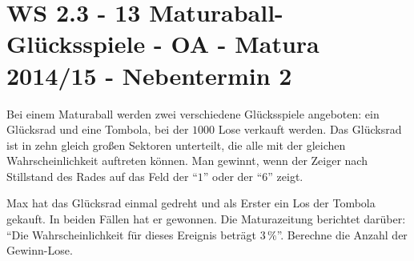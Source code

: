 \section{WS 2.3 - 13 Maturaball-Glücksspiele - OA - Matura 2014/15 - Nebentermin 2}

\begin{beispiel}[WS 2.3]{1} %
				Bei einem Maturaball werden zwei verschiedene Glücksspiele angeboten: ein Glücksrad und eine Tombola, bei der $1000$ Lose verkauft werden. Das Glücksrad ist in zehn gleich großen Sektoren unterteilt, die alle mit der gleichen Wahrscheinlichkeit auftreten können. Man gewinnt, wenn der Zeiger nach Stillstand des Rades auf das Feld der "`$1$"' oder der "`$6$"' zeigt.
				
				Max hat das Glücksrad einmal gedreht und als Erster ein Los der Tombola gekauft. In beiden Fällen hat er gewonnen. Die Maturazeitung berichtet darüber: "`Die Wahrscheinlichkeit für dieses Ereignis beträgt $3\,\%$"'. Berechne die Anzahl der Gewinn-Lose.\\
				
\end{beispiel}